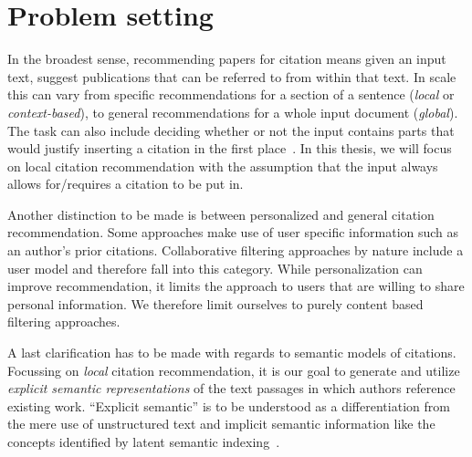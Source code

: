


\section{Problem setting}\label{sec:problemsetting}
In the broadest sense, recommending papers for citation means given an input text, suggest publications that can be referred to from within that text. In scale this can vary from specific recommendations for a section of a sentence (\emph{local} or \emph{context-based}), to general recommendations for a whole input document (\emph{global}). The task can also include deciding whether or not the input contains parts that would justify inserting a citation in the first place~\cite{He2011}. In this thesis, we will focus on local citation recommendation with the assumption that the input always allows for/requires a citation to be put in.

Another distinction to be made is between personalized and general citation recommendation. Some approaches make use of user specific information such as an author's prior citations. Collaborative filtering approaches by nature include a user model and therefore fall into this category. While personalization can improve recommendation, it limits the approach to users that are willing to share personal information. %
We therefore limit ourselves to purely content based filtering approaches.

A last clarification has to be made with regards to semantic models of citations. Focussing on \emph{local} citation recommendation, it is our goal to generate and utilize \emph{explicit semantic representations} of the text passages in which authors reference existing work. ``Explicit semantic'' is to be understood as a differentiation from the mere use of unstructured text and implicit semantic information like the concepts identified by latent semantic indexing~\cite{Deerwester1990}.


